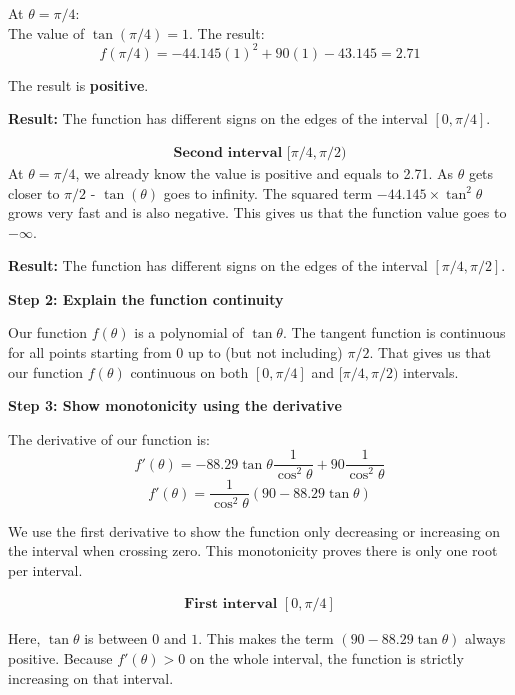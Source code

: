 \documentclass{article}
\begin{document}
At $\theta = \pi/4$: \\
The value of $\tan(\pi/4) = 1$. The result:
\begin{equation}
f(\pi/4) = -44.145(1)^2 + 90(1) - 43.145 = 2.71
\end{equation}

The result is \textbf{positive}.

\textbf{Result:} The function has different signs on the edges of the interval $[0, \pi/4]$.

\begin{align*}
    \textbf{Second interval $[\pi/4, \pi/2)$}
\end{align*}
At $\theta = \pi/4$, we already know the value is positive and equals to 2.71.
As $\theta$ gets closer to $\pi/2$ - $\tan(\theta)$ goes to infinity. The squared term $-44.145 \times \tan^2\theta$ grows very fast and is also negative. This gives us that the function value goes to $-\infty$.

\textbf{Result:} The function has different signs on the edges of the interval $[\pi/4, \pi/2]$.

\vspace{5pt}
\noindent \textbf{Step 2: Explain the function continuity}

Our function $f(\theta)$ is a polynomial of $\tan\theta$. The tangent function is continuous for all points starting from $0$ up to (but not including) $\pi/2$. That gives us that our function $f(\theta)$ continuous on both $[0, \pi/4]$ and $[\pi/4, \pi/2)$ intervals.

\noindent \textbf{Step 3: Show monotonicity using the derivative}

The derivative of our function is:
\begin{equation}
    f'(\theta) = -88.29 \tan\theta \frac{1}{\cos^2\theta} + 90 \frac{1}{\cos^2\theta}
\end{equation}
\begin{equation}
    f'(\theta) = \frac{1}{\cos^2\theta}(90 - 88.29 \tan\theta)
\end{equation}

We use the first derivative to show the function only decreasing or increasing on the interval when crossing zero. This monotonicity proves there is only one root per interval.

\begin{align*}
    \textbf{First interval $[0, \pi/4]$}
\end{align*}

Here, $\tan\theta$ is between $0$ and $1$. This makes the term $(90 - 88.29 \tan\theta)$ always positive. Because $f'(\theta) > 0$ on the whole interval, the function is strictly increasing on that interval.
\end{document}
